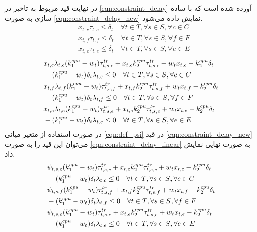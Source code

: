 	در نهایت قید مربوط به تاخیر در \cref{eqn:constraint_delay} آورده شده است که با ساده سازی به صورت \cref{eqn:constraint_delay_new} نمایش داده می‌شود. 
	\begin{subequations}
		\begin{align}\label{eqn:constraint_delay}
			&x_{t,c}\tau_{t,c}\le \delta_t \quad \forall{t \in T}, \forall{s \in S}, \forall{c \in C} \\
			&x_{t,f}\tau_{t,f}\le \delta_t \quad \forall{t \in T}, \forall{s \in S}, \forall{f \in F} \\
			&x_{t,e}\tau_{t,e}\le \delta_t \quad \forall{t \in T}, \forall{s \in S}, \forall{e \in E} 
		\end{align}
	\end{subequations}
	\begin{subequations}\label{eqn:constraint_delay_new}
		\begin{align}		
			&x_{t,c}\lambda_{t,c}(k_1^{cpu}-w_t)\tau^{tr}_{t,s,c} + x_{t,c}k_2^{cpu}\tau_{t,s,c}^{tr}+w_t x_{t,c}-k_2^{cpu}\delta_t \notag \\ &-(k_1^{cpu}-w_t)\delta_t\lambda_{t,c} \le 0 \quad \forall{t \in T}, \forall{s \in S}, \forall{c \in C} \\
			&x_{t,f}\lambda_{t,f}(k_1^{cpu}-w_t)\tau^{tr}_{t,s,f} + x_{t,f}k_2^{cpu}\tau_{t,s,f}^{tr}+w_t x_{t,f}-k_2^{cpu}\delta_t \notag \\ &-(k_1^{cpu}-w_t)\delta_t\lambda_{t,f} \le 0 \quad \forall{t \in T}, \forall{s \in S}, \forall{f \in F}  \\			
			&x_{t,e}\lambda_{t,e}(k_1^{cpu}-w_t)\tau^{tr}_{t,s,e} + x_{t,e}k_2^{cpu}\tau_{t,s,e}^{tr}+w_t x_{t,e}-k_2^{cpu}\delta_t \notag \\ &-(k_1^{cpu}-w_t)\delta_t\lambda_{t,e} \le 0 \quad \forall{t \in T}, \forall{s \in S}, \forall{e \in E}  
		\end{align}
	\end{subequations}
	در صورت استفاده از متغیر میانی \cref{eqn:def_psi} در قید \cref{eqn:constraint_delay_new} می‌توان این قید را به صورت \cref{eqn:constraint_delay_linear} به صورت نهایی نمایش داد. 
	\begin{subequations}\label{eqn:constraint_delay_linear}
		\begin{align}
		&\notag\psi_{t,s,c}(k_1^{cpu}-w_t)\tau^{tr}_{t,s,c} + x_{t,c}k_2^{cpu}\tau_{t,s,c}^{tr}+w_t x_{t,c}-k_2^{cpu}\delta_t \\ &-(k_1^{cpu}-w_t)\delta_t\lambda_{t,c} \le 0 \quad \forall{t \in T}, \forall{s \in S}, \forall{c \in C} \\
		&\notag\psi_{t,s,f}(k_1^{cpu}-w_t)\tau^{tr}_{t,s,f} + x_{t,f}k_2^{cpu}\tau_{t,s,f}^{tr}+w_t x_{t,f}-k_2^{cpu}\delta_t \\ &-(k_1^{cpu}-w_t)\delta_t\lambda_{t,f} \le 0 \quad \forall{t \in T}, \forall{s \in S}, \forall{f \in F} \\
		&\notag\psi_{t,s,e}(k_1^{cpu}-w_t)\tau^{tr}_{t,s,e} + x_{t,e}k_2^{cpu}\tau_{t,s,e}^{tr}+w_t x_{t,e}-k_2^{cpu}\delta_t \\ &-(k_1^{cpu}-w_t)\delta_t\lambda_{t,e} \le 0 \quad \forall{t \in T}, \forall{s \in S}, \forall{e \in E}
		\end{align}
	\end{subequations}

